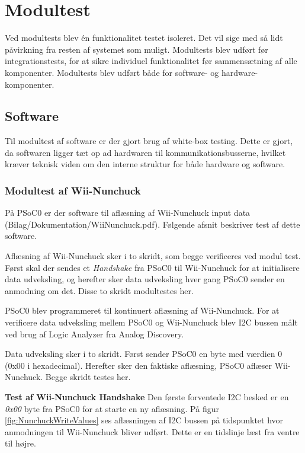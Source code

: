 \chapter{Modultest}
\label{afsnit:modulTest}
Ved modultests blev én funktionalitet testet isoleret. Det vil sige med så lidt påvirkning fra resten af systemet som muligt. Modultests blev udført før integrationstests, for at sikre individuel funktionalitet før sammensætning af alle komponenter. Modultests blev udført både for software- og hardware-komponenter.

\section{Software}
Til modultest af software er der gjort brug af white-box testing. Dette er gjort, da softwaren ligger tæt op ad hardwaren til kommunikationsbusserne, hvilket kræver teknisk viden om den interne struktur for både hardware og software.

\subsection{Modultest af Wii-Nunchuck}
På PSoC0 er der software til aflæsning af Wii-Nunchuck input data (Bilag/Dokumentation/WiiNunchuck.pdf). Følgende afsnit beskriver test af dette software.\newline

\noindent Aflæsning af Wii-Nunchuck sker i to skridt, som begge verificeres ved modul test. Først skal der sendes et \textit{Handshake} fra PSoC0 til Wii-Nunchuck for at initialisere data udveksling, og herefter sker data udveksling hver gang PSoC0 sender en anmodning om det. Disse to skridt modultestes her.\newline


\noindent PSoC0 blev programmeret til kontinuert aflæsning af Wii-Nunchuck. For at verificere data udveksling mellem PSoC0 og Wii-Nunchuck blev I2C bussen målt ved brug af Logic Analyzer fra Analog Discovery. \newline

\noindent Data udveksling sker i to skridt. Først sender PSoC0 en byte med værdien 0 (0x00 i hexadecimal). Herefter sker den faktiske aflæsning, PSoC0 aflæser Wii-Nunchuck. Begge skridt testes her. \newline


\noindent\textbf{Test af Wii-Nunchuck Handshake}\newline
\noindent Den første forventede I2C besked er en \textit{0x00} byte fra PSoC0 for at starte en ny aflæsning. På figur \ref{fig:NunchuckWriteValues} ses aflæsningen af I2C bussen på tidspunktet hvor anmodningen til Wii-Nunchuck bliver udført. Dette er en tidslinje læst fra ventre til højre.\newline


